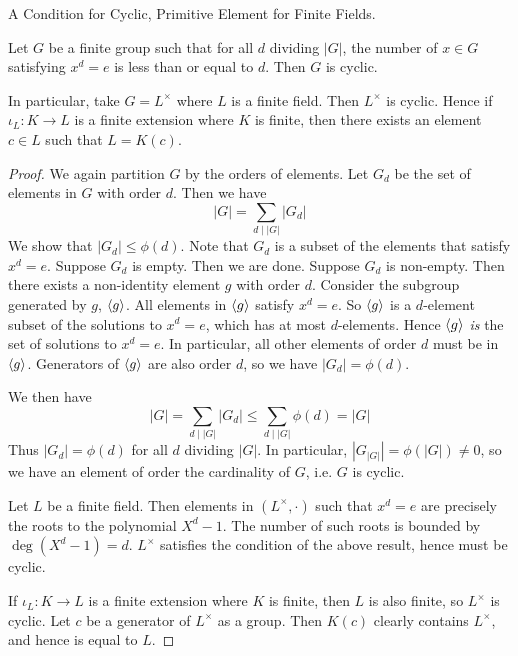 \documentclass[../book.tex]{subfiles}
\begin{document}
\begin{thm} A Condition for Cyclic, Primitive Element for Finite Fields.
    
    Let $G$ be a finite group such that for all $d$ dividing $|G|$, 
    the number of $x \in G$ satisfying $x^d = e$ is less than or equal to $d$. 
    Then $G$ is cyclic.
    
    In particular, take $G = L^\times$ where $L$ is a finite field.
    Then $L^\times$ is cyclic. 
    Hence if $\iota_L : K \to L$ is a finite extension where $K$ is finite,
    then there exists an element $c \in L$ such that $L = K(c)$.
\end{thm}
\begin{proof}
    
    We again partition $G$ by the orders of elements. 
    Let $G_d$ be the set of elements in $G$ with order $d$. 
    Then we have \[
        |G| = \sum_{d \mid |G|} |G_d|
    \]
    We show that $|G_d| \leq \phi(d)$. 
    Note that $G_d$ is a subset of the elements that satisfy $x^d = e$. 
    Suppose $G_d$ is empty. Then we are done.
    Suppose $G_d$ is non-empty. 
    Then there exists a non-identity element $g$ with order $d$.
    Consider the subgroup generated by $g$, $\langle g\rangle$. 
    All elements in $\langle g\rangle$ satisfy $x^d = e$.
    So $\langle g\rangle$ is a $d$-element subset of the solutions to $x^d = e$,
    which has at most $d$-elements.
    Hence $\langle g\rangle$ \emph{is} the set of solutions to $x^d = e$.
    In particular, all other elements of order $d$ must be in $\langle g\rangle$.
    Generators of $\langle g\rangle$ are also order $d$, so we have $|G_d| = \phi(d)$. 
    
    We then have \[
        |G| = \sum_{d \mid |G|} |G_d| \leq \sum_{d \mid |G|} \phi(d) = |G|
    \]
    Thus $|G_d| = \phi(d)$ for all $d$ dividing $|G|$. 
    In particular, $|G_{|G|}| = \phi(|G|) \neq 0$, 
    so we have an element of order the cardinality of $G$,
    i.e. $G$ is cyclic.
    
    Let $L$ be a finite field. 
    Then elements in $(L^\times,\cdot)$ such that $x^d = e$ are precisely 
    the roots to the polynomial $X^d - 1$.
    The number of such roots is bounded by $\deg (X^d - 1) = d$. 
    $L^\times$ satisfies the condition of the above result, hence must be cyclic.
    
    If $\iota_L : K \to L$ is a finite extension where $K$ is finite,
    then $L$ is also finite, so $L^\times$ is cyclic.
    Let $c$ be a generator of $L^\times$ as a group. 
    Then $K(c)$ clearly contains $L^\times$, and hence is equal to $L$. 
\end{proof}

%
\end{document}

